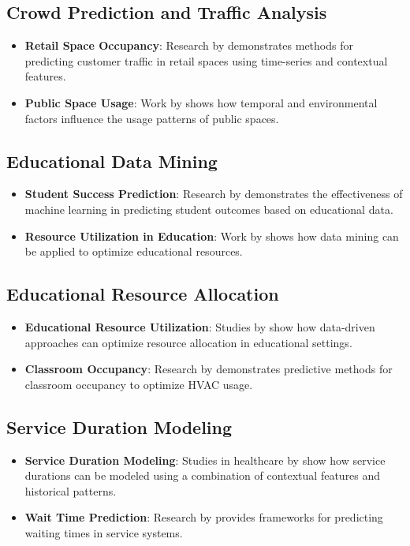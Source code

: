 \documentclass[12pt,letterpaper]{article}
\begin{document}
\subsection{Crowd Prediction and Traffic Analysis}
\begin{itemize}
    \item \textbf{Retail Space Occupancy}: Research by \citet{lam2016} demonstrates methods for predicting customer traffic in retail spaces using time-series and contextual features.
    \item \textbf{Public Space Usage}: Work by \citet{becker2013} shows how temporal and environmental factors influence the usage patterns of public spaces.
\end{itemize}

\subsection{Educational Data Mining}
\begin{itemize}
    \item \textbf{Student Success Prediction}: Research by \citet{baker2009} demonstrates the effectiveness of machine learning in predicting student outcomes based on educational data.
    \item \textbf{Resource Utilization in Education}: Work by \citet{romero2010} shows how data mining can be applied to optimize educational resources.
\end{itemize}

\subsection{Educational Resource Allocation}
\begin{itemize}
    \item \textbf{Educational Resource Utilization}: Studies by \citet{smith2018} show how data-driven approaches can optimize resource allocation in educational settings.
    \item \textbf{Classroom Occupancy}: Research by \citet{chang2015} demonstrates predictive methods for classroom occupancy to optimize HVAC usage.
\end{itemize}

\subsection{Service Duration Modeling}
\begin{itemize}
    \item \textbf{Service Duration Modeling}: Studies in healthcare by \citet{senderovich2015} show how service durations can be modeled using a combination of contextual features and historical patterns.
    \item \textbf{Wait Time Prediction}: Research by \citet{ibrahim2011} provides frameworks for predicting waiting times in service systems.
\end{itemize}
\end{document}
